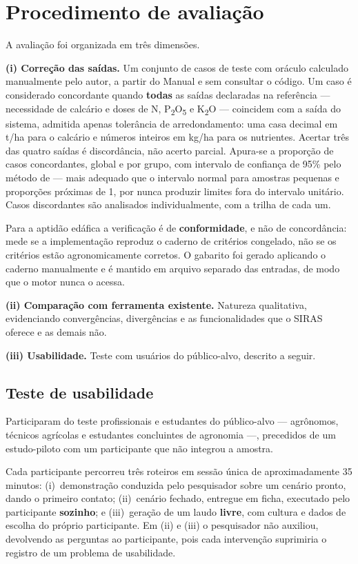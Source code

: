 \section{Procedimento de avaliação}

A avaliação foi organizada em três dimensões.

\textbf{(i) Correção das saídas.} Um conjunto de casos de teste com oráculo calculado
manualmente pelo autor, a partir do Manual e sem consultar o código. Um caso é
considerado concordante quando \textbf{todas} as saídas declaradas na referência ---
necessidade de calcário e doses de N, P\textsubscript{2}O\textsubscript{5} e
K\textsubscript{2}O --- coincidem com a saída do sistema, admitida apenas tolerância de
arredondamento: uma casa decimal em t/ha para o calcário e números inteiros em kg/ha para
os nutrientes. Acertar três das quatro saídas é discordância, não acerto parcial. Apura-se
a proporção de casos concordantes, global e por grupo, com intervalo de confiança de 95\%
pelo método de \cite{Wilson1927} --- mais adequado que o intervalo normal para amostras
pequenas e proporções próximas de 1, por nunca produzir limites fora do intervalo
unitário. Casos discordantes são analisados individualmente, com a trilha de cada um.

Para a aptidão edáfica a verificação é de \textbf{conformidade}, e não de concordância:
mede se a implementação reproduz o caderno de critérios congelado, não se os critérios
estão agronomicamente corretos. O gabarito foi gerado aplicando o caderno manualmente e
é mantido em arquivo separado das entradas, de modo que o motor nunca o acessa.

\textbf{(ii) Comparação com ferramenta existente.} Natureza qualitativa, evidenciando
convergências, divergências e as funcionalidades que o SIRAS oferece e as demais não.

\textbf{(iii) Usabilidade.} Teste com usuários do público-alvo, descrito a seguir.

\subsection{Teste de usabilidade}

Participaram do teste  profissionais e
estudantes do público-alvo --- agrônomos, técnicos agrícolas e estudantes concluintes de
agronomia ---, precedidos de um estudo-piloto com um participante que não integrou a
amostra.

Cada participante percorreu três roteiros em sessão única de aproximadamente 35 minutos:
(i)~demonstração conduzida pelo pesquisador sobre um cenário pronto, dando o primeiro
contato; (ii)~cenário fechado, entregue em ficha, executado pelo participante
\textbf{sozinho}; e (iii)~geração de um laudo \textbf{livre}, com cultura e dados de
escolha do próprio participante. Em (ii) e (iii) o pesquisador não auxiliou, devolvendo
as perguntas ao participante, pois cada intervenção suprimiria o registro de um problema
de usabilidade.

